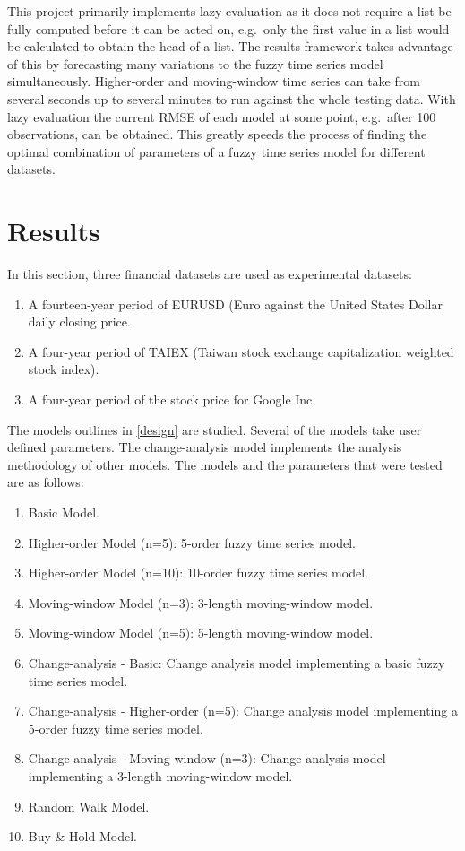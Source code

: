 \documentclass[12pt, oneside, a4paper]{article}
\theoremstyle{definition}
\begin{document}
This project primarily implements lazy evaluation as it does not require a list be fully computed before it can be acted on, e.g.\ only the first value in a list would be calculated to obtain the head of a list. The results framework takes advantage of this by forecasting many variations to the fuzzy time series model simultaneously. Higher-order and moving-window time series can take from several seconds up to several minutes to run against the whole testing data. With lazy evaluation the current RMSE of each model at some point, e.g.\ after 100 observations, can be obtained. This greatly speeds the process of finding the optimal combination of parameters of a fuzzy time series model for different datasets.

\section{Results}

\label{results}

In this section, three financial datasets are used as experimental datasets:

\begin{enumerate}
\item A fourteen-year period of EURUSD (Euro against the United States Dollar daily closing price.
\item A four-year period of TAIEX (Taiwan stock exchange capitalization weighted stock index).
\item A four-year period of the stock price for Google Inc.
\end{enumerate}

The models outlines in \cref{design} are studied. Several of the models take user defined parameters. The change-analysis model implements the analysis methodology of other models. The models and the parameters that were tested are as follows:

\begin{enumerate}[label=\roman*]
\item Basic Model.
\item Higher-order Model (n=5): 5-order fuzzy time series model.
\item Higher-order Model (n=10): 10-order fuzzy time series model.
\item Moving-window Model (n=3): 3-length moving-window model.
\item Moving-window Model (n=5): 5-length moving-window model.
\item Change-analysis - Basic: Change analysis model implementing a basic fuzzy time series model.
\item Change-analysis - Higher-order (n=5): Change analysis model implementing a 5-order fuzzy time series model.
\item Change-analysis - Moving-window (n=3): Change analysis model implementing a 3-length moving-window model.
\item Random Walk Model.
\item Buy \& Hold Model.
\end{enumerate}
\end{document}
